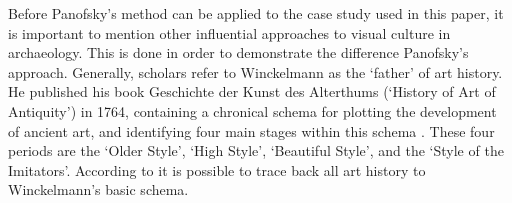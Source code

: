 Before Panofsky’s method can be applied to the case study used in this paper, it is important to mention other influential approaches to visual culture in archaeology. This is done in order to demonstrate the difference Panofsky’s approach. Generally, scholars refer to Winckelmann as the ‘father’ of art history. He published his book Geschichte der Kunst des Alterthums (‘History of Art of Antiquity’) in 1764, containing a chronical schema for plotting the development of ancient art, and identifying four main stages within this schema \parencite[68--69] {BeardHenderson_2001}. These four periods are the ‘Older Style’, ‘High Style’, ‘Beautiful Style’, and the ‘Style of the Imitators’. According to \textcite {BeardHenderson_2001}  it is possible to trace back all art history to Winckelmann’s basic schema.

